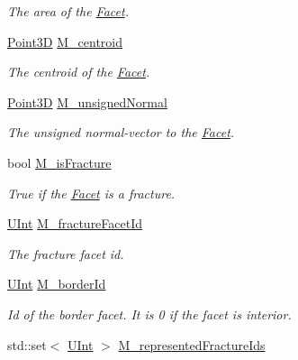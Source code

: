 \begin{DoxyCompactItemize}
\begin{DoxyCompactList}\small\item\em The area of the \hyperlink{classFVCode3D_1_1Rigid__Mesh_1_1Facet}{Facet}. \end{DoxyCompactList}\item 
\hyperlink{classFVCode3D_1_1Point3D}{Point3D} \hyperlink{classFVCode3D_1_1Rigid__Mesh_1_1Facet_a59362b500ff0b33abe8b2bc2ea678916}{M\+\_\+centroid}
\begin{DoxyCompactList}\small\item\em The centroid of the \hyperlink{classFVCode3D_1_1Rigid__Mesh_1_1Facet}{Facet}. \end{DoxyCompactList}\item 
\hyperlink{classFVCode3D_1_1Point3D}{Point3D} \hyperlink{classFVCode3D_1_1Rigid__Mesh_1_1Facet_a2a6a16d188a038509d285dd778c82f81}{M\+\_\+unsigned\+Normal}
\begin{DoxyCompactList}\small\item\em The unsigned normal-\/vector to the \hyperlink{classFVCode3D_1_1Rigid__Mesh_1_1Facet}{Facet}. \end{DoxyCompactList}\item 
bool \hyperlink{classFVCode3D_1_1Rigid__Mesh_1_1Facet_aa73335dc182e64f956d5628a1c00db83}{M\+\_\+is\+Fracture}
\begin{DoxyCompactList}\small\item\em True if the \hyperlink{classFVCode3D_1_1Rigid__Mesh_1_1Facet}{Facet} is a fracture. \end{DoxyCompactList}\item 
\hyperlink{namespaceFVCode3D_a4bf7e328c75d0fd504050d040ebe9eda}{U\+Int} \hyperlink{classFVCode3D_1_1Rigid__Mesh_1_1Facet_ae787539c2e6ca9cd957fc1049eae764f}{M\+\_\+fracture\+Facet\+Id}
\begin{DoxyCompactList}\small\item\em The fracture facet id. \end{DoxyCompactList}\item 
\hyperlink{namespaceFVCode3D_a4bf7e328c75d0fd504050d040ebe9eda}{U\+Int} \hyperlink{classFVCode3D_1_1Rigid__Mesh_1_1Facet_a9e19b99a99bab61888ff73cac17de747}{M\+\_\+border\+Id}
\begin{DoxyCompactList}\small\item\em Id of the border facet. It is 0 if the facet is interior. \end{DoxyCompactList}\item 
std\+::set$<$ \hyperlink{namespaceFVCode3D_a4bf7e328c75d0fd504050d040ebe9eda}{U\+Int} $>$ \hyperlink{classFVCode3D_1_1Rigid__Mesh_1_1Facet_a95681de925b4e9f6bfbcb239712aede2}{M\+\_\+represented\+Fracture\+Ids}

\end{DoxyCompactItemize}
